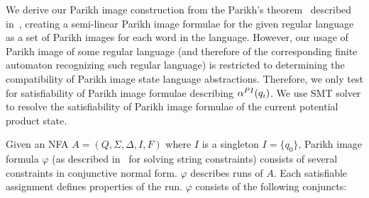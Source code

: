 We derive our Parikh image construction from the Parikh's theorem~\cite{Kozen1977} described in~\cite{ParikhsTheoremSimpleAndDirectConstruction}, creating a semi-linear Parikh image formulae for the given regular language as a set of Parikh images for each word in the language. However, our usage of Parikh image of some regular language (and therefore of the corresponding finite automaton recognizing such regular language) is restricted to determining the compatibility of Parikh image state language abstractions. Therefore, we only test for satisfiability of Parikh image formulae describing $\alpha^{PI}(q_i)$. We use SMT solver to resolve the satisfiability of Parikh image formulae of the current potential product state.

Given an NFA $A = (Q, \Sigma, \Delta, I, F)$ where $I$ is a singleton $I = \{ q_{0} \}$, Parikh image formula $\varphi$ (as described in~\cite{PI_computation/10.1007/978-3-030-45093-9_59} for solving string constraints) consists of several constraints in conjunctive normal form. $\varphi$ describes runs of $A$. Each satisfiable assignment defines properties of the run. $\varphi$ consists of the following conjuncts:


